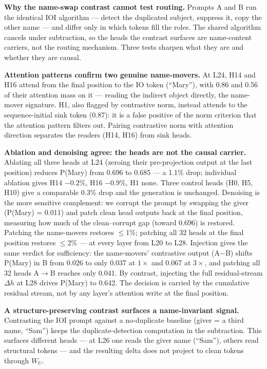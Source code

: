 \documentclass[11pt]{article}
\newcommand{\dhh}{\Delta h}
\newcommand{\WU}{W_U}
\begin{document}
\textbf{Why the name-swap contrast cannot test routing.} Prompts A and B run the
identical IOI algorithm --- detect the duplicated subject, suppress it, copy the
other name --- and differ only in which tokens fill the roles. The shared
algorithm cancels under subtraction, so the heads the contrast surfaces are
name-content carriers, not the routing mechanism. Three tests sharpen what they
are and whether they are causal.

\textbf{Attention patterns confirm two genuine name-movers.} At L24, H14 and H16
attend from the final position to the IO token (``Mary''), with 0.86 and 0.56 of
their attention mass on it --- reading the indirect object directly, the
name-mover signature. H1, also flagged by contrastive norm, instead attends to
the sequence-initial sink token (0.87): it is a false positive of the norm
criterion that the attention pattern filters out. Pairing contrastive norm with
attention direction separates the readers (H14, H16) from sink heads.

\textbf{Ablation and denoising agree: the heads are not the causal carrier.}
Ablating all three heads at L24 (zeroing their pre-projection output at the last
position) reduces P(Mary) from 0.696 to 0.685 --- a 1.1\% drop; individual
ablation gives H14 $-0.2$\%, H16 $-0.9$\%, H1 none. Three control heads (H0, H5, H10)
give a comparable 0.3\% drop and the generation is unchanged. Denoising is the
more sensitive complement: we corrupt the prompt by swapping the giver
(P(Mary) = 0.011) and patch clean head outputs back at the final position,
measuring how much of the clean--corrupt gap (toward 0.696) is restored.
Patching the name-movers restores $\le$1\%; patching all 32 heads at the final
position restores $\le$2\% --- at every layer from L20 to L28. Injection gives the
same verdict for sufficiency: the name-movers' contrastive output (A$-$B)
shifts P(Mary) in B from 0.026 to only 0.037 at $1\times$ and 0.067 at $3\times$, and
patching all 32 heads A$\rightarrow$B reaches only 0.041. By contrast, injecting the full
residual-stream $\dhh$ at L28 drives P(Mary) to 0.642. The decision is carried by
the cumulative residual stream, not by any layer's attention write at the
final position.

\textbf{A structure-preserving contrast surfaces a name-invariant signal.} Contrasting
the IOI prompt against a no-duplicate baseline (giver = a third name, ``Sam'')
keeps the duplicate-detection computation in the subtraction. This surfaces
different heads --- at L26 one reads the giver name (``Sam''), others read
structural tokens --- and the resulting delta does not project to clean tokens
through $\WU$.
\end{document}
